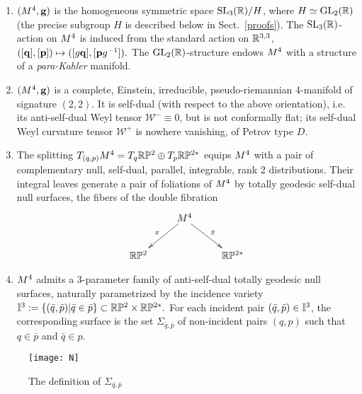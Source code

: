 \begin{theorem} \label{Ten}

\sn\begin{enumerate}[leftmargin=*]\setlength\itemsep{5pt}
\item  $(M^4,\mathbf{ g})$ is the  homogeneous  symmetric space  ${\mathrm{SL}_3(\mathbb{R})}/H$, where   $H\simeq \mathrm{GL}_2(\mathbb{R})$ (the precise subgroup $H$ is described below in Sect.~\ref{proofs}).  The ${\mathrm{SL}_3(\mathbb{R})}$-action on $M^4$ is induced from the standard action on $\mathbb{R}^{3,3}$, $([\mathbf q], [{\mathbf p}])\mapsto ([g\mathbf q], [{\mathbf p} g^{-1}]).$ The $\mathrm{GL}_2(\mathbb{R})$-structure endows $M^4$ with a structure of a {\em para-Kahler} manifold. 

\item  $(M^4,\mathbf{ g})$  is a  complete, Einstein,   irreducible, pseudo-riemannian 4-manifold of signature $(2,2)$. 
It   is self-dual (with respect to the above orientation), i.e. its anti-self-dual Weyl tensor $\mathcal W^-\equiv0$,  but  is not conformally flat; its self-dual Weyl curvature tensor $\mathcal W^+$ is nowhere vanishing, of Petrov type $D$.  



\item The splitting $T_{(q,p)}M^4=T_q\mathbb{R}\mathbb{P}^2\oplus T_p\mathbb{R}\mathbb{P}^{2*}$ equips $M^4$ with a pair of complementary  null, self-dual,  parallel,  integrable,   rank 2 distributions. Their integral leaves generate a pair of foliations of $M^4$ by  totally geodesic self-dual null surfaces, the fibers of the double  fibration
%
$$    \xymatrix{
        &\M  \ar[dl]_\pi \ar[dr]^{\bar\pi} & \\
                   \RPt&            & \RPts }
$$

\item $M^4$ admits a 3-parameter family of anti-self-dual totally geodesic
 null surfaces, naturally parametrized by the incidence variety  ${\mathbb I^3}:=\{(\bar q, \bar p)|\bar q\in \bar p\}\subset\mathbb{R}\mathbb{P}^2\times\mathbb{R}\mathbb{P}^{2*}.$
For  each incident pair $(\bar q, \bar p)\in{\mathbb I^3}$, the corresponding surface is the set $\Sigma_{\bar q, \bar p}$ of non-incident pairs $(q,p)$ such that $q\in\bar p$ and $\bar q\in p$. 
\end{enumerate}
\end{theorem}
\begin{figure}[h]\centering
\texttt{[image: N]}
\caption{The definition of   $\Sigma_{\bar q, \bar p}$}
\end{figure}
%
